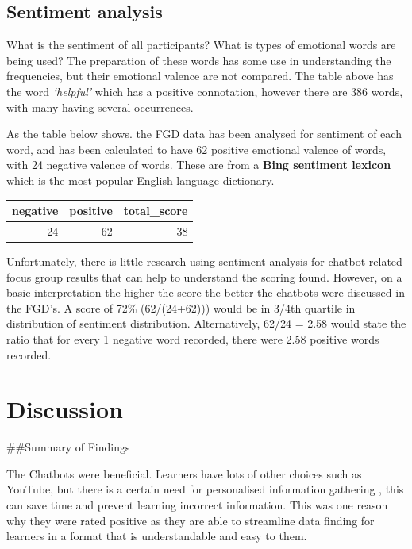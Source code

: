 \documentclass[a4paper, nobind]{templates/ociamthesis}
\begin{document}
\hypertarget{sentiment-analysis}{%
\section{Sentiment analysis}\label{sentiment-analysis}}

What is the sentiment of all participants? What is types of emotional
words are being used? The preparation of these words has some use in
understanding the frequencies, but their emotional valence are not
compared. The table above has the word \emph{`helpful'} which has a positive
connotation, however there are 386 words, with many having several
occurrences.

As the table below shows. the FGD data has been analysed for sentiment
of each word, and has been calculated to have 62 positive emotional
valence of words, with 24 negative valence of words. These are from a
\textbf{Bing sentiment lexicon} which is the most popular English language
dictionary.

\begin{tabular}{r|r|r}
\hline
negative & positive & total\_score\\
\hline
24 & 62 & 38\\
\hline
\end{tabular}

Unfortunately, there is little research using sentiment analysis for
chatbot related focus group results that can help to understand the
scoring found. However, on a basic interpretation the higher the score
the better the chatbots were discussed in the FGD's. A score of 72\%
(62/(24+62))) would be in 3/4th quartile in distribution of sentiment
distribution. Alternatively, 62/24 = 2.58 would state the ratio that for
every 1 negative word recorded, there were 2.58 positive words recorded.

\hypertarget{Discussion}{%
\chapter{Discussion}\label{Discussion}}

\minitoc 

\#\#Summary of Findings

The Chatbots were beneficial. Learners have lots of other choices such as YouTube, but there is a certain need for personalised information gathering , this can save time and prevent learning incorrect information. This was one reason why they were rated positive as they are able to streamline data finding for learners in a format that is understandable and easy to them.
\end{document}
